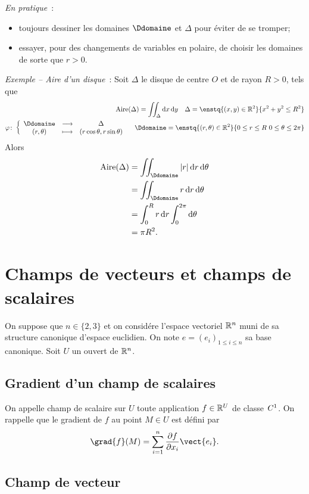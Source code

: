 \emph{En pratique}~:
\begin{itemize}
\item toujours dessiner les domaines $\Ddomaine$ et $\Delta$ pour éviter de se tromper;
\item essayer, pour des changements de variables en polaire, de choisir les domaines de sorte que $r>0$.
\end{itemize}

\emph{Exemple -- Aire d'un disque}~: Soit $\Delta$ le disque de centre $O$ et de rayon $R>0$, tels que
 \begin{align}
   \text{Aire}(\Delta) = \iint_\Delta \diff x \diff y \quad \Delta=\enstq{(x,y)\in\R^2}{x^2+y^2\leq R^2} \\
   \fonction{\varphi}{\Ddomaine}{\Delta}{(r, \theta)}{(r\cos\theta, r\sin\theta)} \quad \Ddomaine=\enstq{(r,\theta)\in\R^2}{0 \leq r \leq R \ 0 \leq \theta \leq 2\pi}
 \end{align}
Alors
\begin{align}
  \text{Aire}(\Delta) &= \iint_\Ddomaine \abs{r}\diff r \diff \theta \\
  &= \iint_\Ddomaine r\diff r \diff \theta \\
  &=\int_0^R r\diff r \int_0^{2\pi}\diff \theta \\
  &=\pi R^2.
\end{align}


\section{Champs de vecteurs et champs de scalaires}

On suppose que $n \in \{2, 3\}$ et on considére l'espace vectoriel $\mathbb{R}^n$ muni de sa structure canonique d'espace euclidien. On note $e=(e_i)_{1 \leq i \leq n}$ sa base canonique. Soit $U$ un ouvert de $\mathbb{R}^n$.

\subsection{Gradient d'un champ de scalaires}

On appelle champ de scalaire sur $U$ toute application $f \in \mathbb{R}^U$ de classe $\mathit{C}^1$. On rappelle que le gradient de $f$ au point $M \in U$ est défini par
\begin{equation}
  \grad{f}(M) = \sum_{i=1}^n \derivep{f}{x_i} \vect{e_i}.
\end{equation}

\subsection{Champ de vecteur}


